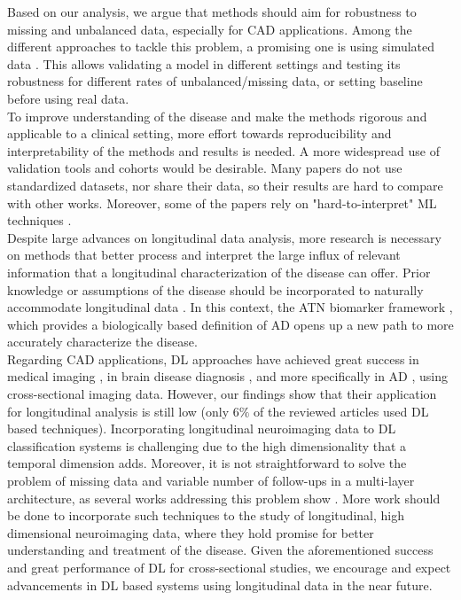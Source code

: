 Based on our analysis, we argue that methods should aim for robustness to missing and unbalanced data, especially for CAD applications. Among the different approaches to tackle this problem, a promising one is using simulated data \cite{Chen2011b,Chen2012,Eshaghi2017,Hyun2016,Li2017b,Li2013,Zhang2014,Ziegler2015b}. This allows validating a model in different settings and testing its robustness for different rates of unbalanced/missing data, or setting baseline before using real data. \\

To improve understanding of the disease and make the methods rigorous and applicable to a clinical setting, more effort towards reproducibility and interpretability of the methods and results is needed. A more widespread use of validation tools and cohorts would be desirable. Many papers do not use standardized datasets, nor share their data, so their results are hard to compare with other works. Moreover, some of the papers rely on "hard-to-interpret" ML techniques \cite{Givon2017,Zhang2017}. \\

Despite large advances on longitudinal data analysis, more research is necessary on methods that better process and interpret the large influx of relevant information that a longitudinal characterization of the disease can offer. Prior knowledge or assumptions of the disease should be incorporated to naturally accommodate longitudinal data \cite{Fonteijn2012,Gavidia-Bovadilla2017,Zhu2016a}. In this context, the ATN biomarker framework \cite{Jack2018}, which provides a biologically based definition of AD opens up a new path to more accurately characterize the disease. \\

Regarding CAD applications, DL approaches have achieved great success in medical imaging \cite{Litjens2017}, in brain disease diagnosis \cite{Talo2019,Talo2019b}, and more specifically in AD \cite{Liu2014,Jo2019}, using cross-sectional imaging data. However, our findings show that their application for longitudinal analysis is still low (only $6\%$ of the reviewed articles used DL based techniques). Incorporating longitudinal neuroimaging data to DL classification systems is challenging due to the high dimensionality that a temporal dimension adds. Moreover, it is not straightforward to solve the problem of missing data and variable number of follow-ups in a multi-layer architecture, as several works addressing this problem show \cite{Givon2017,Ghazi2019}. More work should be done to incorporate such techniques to the study of longitudinal, high dimensional neuroimaging data, where they hold promise for better understanding and treatment of the disease. Given the aforementioned success and great performance of DL for cross-sectional studies, we encourage and expect advancements in DL based systems using longitudinal data in the near future.\\

